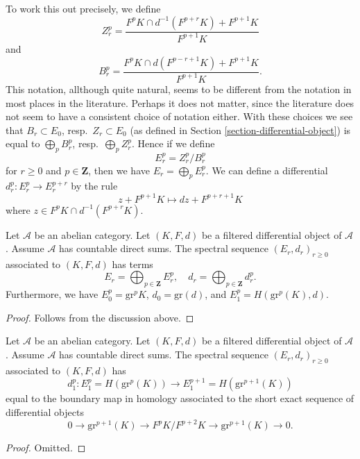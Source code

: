 \medskip\noindent
To work this out precisely, we define
$$
Z_r^p =
\frac{F^pK \cap d^{-1}(F^{p + r}K) + F^{p + 1}K}{F^{p + 1}K}
$$
and
$$
B_r^p =
\frac{F^pK \cap d(F^{p - r + 1}K) + F^{p + 1}K}{F^{p + 1}K}.
$$
This notation, allthough quite natural, seems to be different from the
notation in most places in the literature. Perhaps it does not matter,
since the literature does not seem to have a consistent choice of notation
either. With these choices we see that $B_r \subset E_0$,
resp.\ $Z_r \subset E_0$ (as defined in
Section \ref{section-differential-object}) is equal to
$\bigoplus_p B_r^p$, resp.\ $\bigoplus_p Z_r^p$.
Hence if we define
$$
E_r^p = Z_r^p/B_r^p
$$
for $r \geq 0$ and $p \in \mathbf{Z}$, then we have $E_r = \bigoplus_p E_r^p$.
We can define a differential $d_r^p : E_r^p \to E_r^{p + r}$
by the rule
$$
z + F^{p + 1}K
\longmapsto
dz + F^{p + r + 1}K
$$
where $z \in F^pK \cap d^{-1}(F^{p + r}K)$.

\begin{lemma}
\label{lemma-spectral-sequence-filtered-differential}
Let $\mathcal{A}$ be an abelian category.
Let $(K, F, d)$ be a filtered differential object of $\mathcal{A}$.
Assume $\mathcal{A}$ has countable direct sums.
The spectral sequence $(E_r, d_r)_{r \geq 0}$
associated to $(K, F, d)$ has terms
$$
E_r = \bigoplus\nolimits_{p \in \mathbf{Z}} E_r^p,
\quad
d_r = \bigoplus\nolimits_{p \in \mathbf{Z}} d_r^p.
$$
Furthermore, we have
$E_0^p = \text{gr}^p K$, $d_0 = \text{gr}(d)$,
and $E_1^p = H(\text{gr}^p(K), d)$.
\end{lemma}

\begin{proof}
Follows from the discussion above.
\end{proof}

\begin{lemma}
\label{lemma-spectral-sequence-filtered-differential-d1}
Let $\mathcal{A}$ be an abelian category.
Let $(K, F, d)$ be a filtered differential object of $\mathcal{A}$.
Assume $\mathcal{A}$ has countable direct sums.
The spectral sequence $(E_r, d_r)_{r \geq 0}$
associated to $(K, F, d)$ has
$$
d_1^p :
E_1^p = H(\text{gr}^p(K))
\longrightarrow
E_1^{p + 1} = H(\text{gr}^{p + 1}(K))
$$
equal to the boundary map in homology associated to the short
exact sequence of differential objects
$$
0 \to \text{gr}^{p + 1}(K) \to F^pK/F^{p + 2}K \to \text{gr}^{p + 1}(K) \to 0.
$$
\end{lemma}

\begin{proof}
Omitted.
\end{proof}

